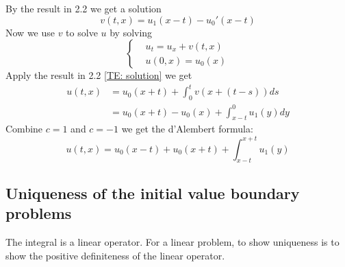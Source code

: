 By the result in 2.2 we get a solution
\begin{equation*}
	v(t, x) = u_1(x - t) - u_0'(x - t)
\end{equation*}
Now we use $v$ to solve $u$ by solving
\begin{equation*}
\left\{
\begin{aligned}
	&u_t = u_x + v(t, x)\\
	&u(0, x) = u_0(x)
\end{aligned}
\right.
\end{equation*}
Apply the result in 2.2 \ref{TE: solution} we get
\begin{align*}
	u(t, x) &= u_0(x + t) + \int_0^t v(x + (t-s))ds\\
			&=u_0(x + t)  - u_0(x) + \int_{x - t}^0 u_1(y)dy
\end{align*}
Combine $c = 1$ and $c = -1$ we get the d'Alembert formula:
\begin{equation} \label{d'Alembert}
	u(t, x) = u_0(x-t) + u_0(x+t) + \int_{x-t}^{x+t} u_1(y)
\end{equation}

\subsection{Uniqueness of the initial value boundary problems}
The integral is a linear operator. For a linear problem, to show uniqueness is to show the positive definiteness of the linear operator.
